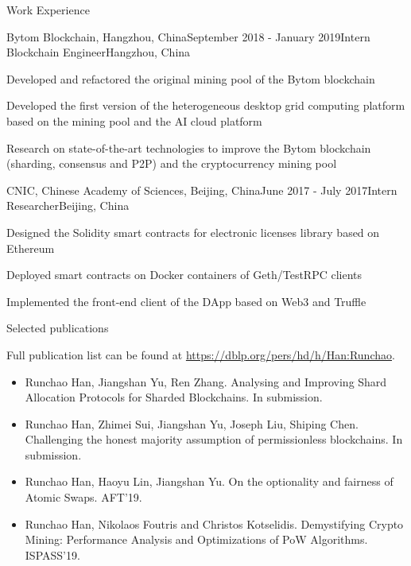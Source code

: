 \documentclass{resume} %
\begin{document}

\begin{rSection}{Work Experience}

\begin{rSubsection}{Bytom Blockchain, Hangzhou, China}{September 2018 - January 2019}{Intern Blockchain Engineer}{Hangzhou, China}
\item Developed and refactored the original mining pool of the Bytom blockchain
\item Developed the first version of the heterogeneous desktop grid computing platform based on the mining pool and the AI cloud platform
\item Research on state-of-the-art technologies to improve the Bytom blockchain (sharding, consensus and P2P) and the cryptocurrency mining pool
\end{rSubsection}

\begin{rSubsection}{CNIC, Chinese Academy of Sciences, Beijing, China}{June 2017 - July 2017}{Intern Researcher}{Beijing, China}
\item Designed the Solidity smart contracts for electronic licenses library based on Ethereum
\item Deployed smart contracts on Docker containers of Geth/TestRPC clients
\item Implemented the front-end client of the DApp based on Web3 and Truffle
\end{rSubsection}

\end{rSection}




\begin{rSection}{Selected publications} 

Full publication list can be found at \url{https://dblp.org/pers/hd/h/Han:Runchao}.

\begin{itemize}
    \item Runchao Han, Jiangshan Yu, Ren Zhang. Analysing and Improving Shard Allocation Protocols for Sharded Blockchains. In submission.
    \item Runchao Han, Zhimei Sui, Jiangshan Yu, Joseph Liu, Shiping Chen. Challenging the honest majority assumption of permissionless blockchains. In submission.
    \item Runchao Han, Haoyu Lin, Jiangshan Yu. On the optionality and fairness of Atomic Swaps. AFT'19.
    \item Runchao Han, Nikolaos Foutris and Christos Kotselidis. Demystifying Crypto Mining: Performance Analysis and Optimizations of PoW Algorithms. ISPASS'19.
\end{itemize}

\end{rSection}
\end{document}
